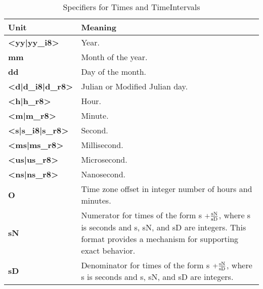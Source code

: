 \newpage
\begin{center}
\begin{table}
\caption{\label{table:timeOpts}Specifiers for Times and TimeIntervals}
\begin{tabular}{|p{1in}|p{3.5in}|}
\hline
Unit & Meaning \\
\hline\hline
{\bf <yy|yy\_i8>} & Year. \\
\hline
{\bf mm} & Month of the year. \\
\hline
{\bf dd} & Day of the month. \\
\hline
{\bf <d|d\_i8|d\_r8>} & Julian or Modified Julian day. \\
\hline
{\bf <h|h\_r8>} & Hour. \\
\hline
{\bf <m|m\_r8>} & Minute. \\
\hline
{\bf <s|s\_i8|s\_r8>} & Second. \\
\hline
{\bf <ms|ms\_r8>} & Millisecond. \\
\hline
{\bf <us|us\_r8>} & Microsecond. \\
\hline
{\bf <ns|ns\_r8>} & Nanosecond. \\
\hline
{\bf O} & Time zone offset in integer number of hours and minutes. \\
\hline
{\bf sN} & Numerator for times of the form s {\bf $ + 
\frac{{\rm sN}}{{\rm sD}}$}, where s is seconds and s, sN, and
sD are integers.  This format provides a mechanism for supporting
exact behavior. \\
\hline
{\bf sD} & Denominator for times of the form s {\bf $ + 
\frac{{\rm sN}}{{\rm sD}}$}, where s is seconds and s, sN, and
sD are integers. \\
\hline
\end{tabular}
\end{table}
\end{center}
